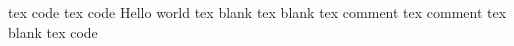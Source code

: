 tex	code	
tex	code	\texbf Hello world
tex	blank	
tex	blank	
tex	comment	%
tex	comment	%
tex	blank	
tex	code	
